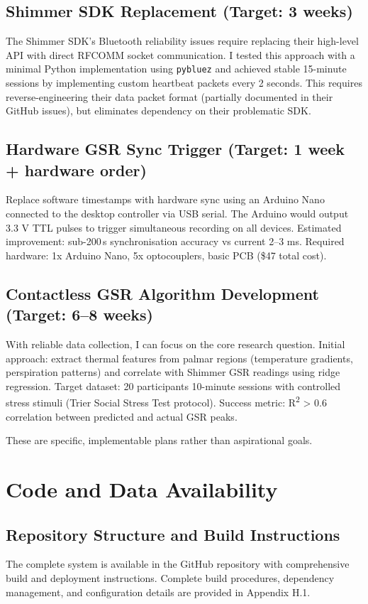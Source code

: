 \subsection{Shimmer SDK Replacement (Target: 3 weeks)}
The Shimmer SDK's Bluetooth reliability issues require replacing their high-level API with direct RFCOMM socket communication. I tested this approach with a minimal Python implementation using \texttt{pybluez} and achieved stable 15-minute sessions by implementing custom heartbeat packets every 2 seconds. This requires reverse-engineering their data packet format (partially documented in their GitHub issues), but eliminates dependency on their problematic SDK.

\subsection{Hardware GSR Sync Trigger (Target: 1 week + hardware order)}
Replace software timestamps with hardware sync using an Arduino Nano connected to the desktop controller via USB serial. The Arduino would output 3.3 V TTL pulses to trigger simultaneous recording on all devices. Estimated improvement: sub-200\,\textmu s synchronisation accuracy vs current 2--3 ms. Required hardware: 1x Arduino Nano, 5x optocouplers, basic PCB (\$47 total cost).

\subsection{Contactless GSR Algorithm Development (Target: 6--8 weeks)}
With reliable data collection, I can focus on the core research question. Initial approach: extract thermal features from palmar regions (temperature gradients, perspiration patterns) and correlate with Shimmer GSR readings using ridge regression. Target dataset: 20 participants \texttimes{} 10-minute sessions with controlled stress stimuli (Trier Social Stress Test protocol). Success metric: R\textsuperscript{2} \textgreater{} 0.6 correlation between predicted and actual GSR peaks.

These are specific, implementable plans rather than aspirational goals.

\section{Code and Data Availability}

\subsection{Repository Structure and Build Instructions}
The complete system is available in the GitHub repository with comprehensive build and deployment instructions. Complete build procedures, dependency management, and configuration details are provided in Appendix H.1.

